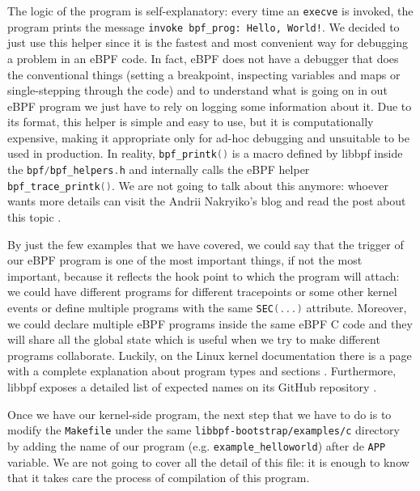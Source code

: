 The logic of the program is self-explanatory: every time an \colorbox{backcolour}{\lstinline[style=highlight, language=bash]|execve|} is invoked, the program prints the message \colorbox{backcolour}{\lstinline[style=highlight, language=bash]|invoke bpf_prog: Hello, World!|}.
We decided to just use this helper since it is the fastest and most convenient way for debugging a problem in an eBPF code.
In fact, eBPF does not have a debugger that does the conventional things (setting a breakpoint, inspecting variables and maps or single-stepping through the code) and to understand what is going on in out eBPF program we just have to rely on logging some information about it.
Due to its format, this helper is simple and easy to use, but it is computationally expensive, making it appropriate only for ad-hoc debugging and unsuitable to be used in production.
In reality, \colorbox{backcolour}{\lstinline[style=cstyle, language=C]|bpf_printk()|} is a macro defined by libbpf inside the \colorbox{backcolour}{\lstinline[style=cstyle, language=C]|bpf/bpf_helpers.h|} and internally calls the eBPF helper \colorbox{backcolour}{\lstinline[style=cstyle, language=C]|bpf_trace_printk()|}.
We are not going to talk about this anymore: whoever wants more details can visit the Andrii Nakryiko's blog and read the post about this topic \cite{ANbpfprintk}.

By just the few examples that we have covered, we could say that the trigger of our eBPF program is one of the most important things, if not the most important, because it reflects the hook point to which the program will attach: we could have different programs for different tracepoints or some other kernel events or define multiple programs with the same \colorbox{backcolour}{\lstinline[style=cstyle, language=C]|SEC(...)|} attribute.
Moreover, we could declare multiple eBPF programs inside the same eBPF C code and they will share all the global state which is useful when we try to make different programs collaborate.
Luckily, on the Linux kernel documentation there is a page with a complete explanation about program types and sections \cite{SecLinuxKernelDoc}.
Furthermore, libbpf exposes a detailed list of expected names on its GitHub repository \cite{SecListlibbpf}.

Once we have our kernel-side program, the next step that we have to do is to modify the \colorbox{backcolour}{\lstinline[style=highlight, language=bash]|Makefile|} under the same \colorbox{backcolour}{\lstinline[style=highlight, language=bash]|libbpf-bootstrap/examples/c|} directory by adding the name of our program (e.g. \colorbox{backcolour}{\lstinline[style=highlight, language=bash]|example_helloworld|}) after de \colorbox{backcolour}{\lstinline[style=highlight, language=bash]|APP|} variable.
We are not going to cover all the detail of this file: it is enough to know that it takes care the process of compilation of this program.


